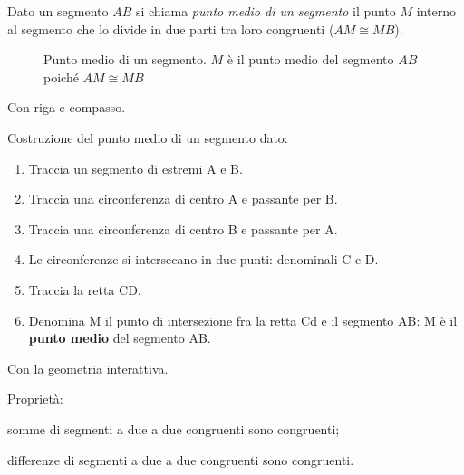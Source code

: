 \begin{definizione}
Dato un segmento $AB$ si chiama \emph{punto medio di un segmento} il 
punto $M$ interno al segmento che lo divide in due parti tra loro 
congruenti ($AM\cong MB$).
\end{definizione}

\begin{inaccessibleblock}
 \begin{figure}[htb]
\centering
\caption{Punto medio di un segmento. $M$ è il punto medio del 
segmento $AB$ poiché $AM\cong MB$}
\end{figure}
\end{inaccessibleblock}

Con riga e compasso.

\begin{procedura}\label{proc:fonda_puntomedio}
  Costruzione del punto medio di un segmento dato:
  \begin{enumerate} [nosep]
    \item 
    Traccia un segmento di estremi A e B.  
    \item 
    Traccia una circonferenza di centro A e passante per B. 
    \item 
    Traccia una circonferenza di centro B e passante per A.  
    \item 
    Le circonferenze si intersecano in due punti: denominali C e D. 
    \item 
    Traccia la retta CD.
    \item 
    Denomina M il punto di intersezione fra la retta Cd e il segmento AB: M è 
il \textbf{punto medio} del segmento AB.
    \end{enumerate}
\end{procedura}

\ifcoding
Con la geometria interattiva.


\fi

Proprietà:
\begin{itemize*}
\item somme di segmenti a due a due congruenti sono congruenti; 
\item differenze di segmenti a due a due congruenti sono congruenti.
\end{itemize*}

